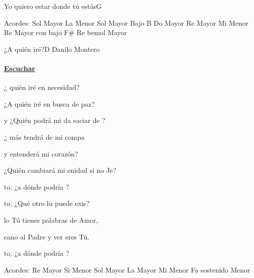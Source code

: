 \documentclass[12pt, spanish]{book}
\begin{document}
\begin{song}{Yo quiero estar donde tú estás}{G}
        \ifChordBk
        \begin{SBOpGroup}
            Acordes:\break
            \upchord{\G}\qquad Sol Mayor \hfill
            \upchord{\Am}\qquad La Menor \hfill\null\break
            \upchord{\GB}\qquad Sol Mayor Bajo B \hfill
            \upchord{\C}\qquad Do Mayor \hfill\null\break
            \upchord{\D}\qquad Re Mayor \hfill
            \upchord{\Em}\qquad Mi Menor \hfill\null\break
            \upchord{\DFs}\qquad Re Mayor con bajo F\# \hfill
            \upchord{\Eflat}Re bemol Mayor \hfill\null\break
        \end{SBOpGroup}
        \fi
    \end{song}

    \begin{song}{¿A quién iré?}{D}
        {} %
        {Danilo Montero}
        {} %
        {}
        \ifChordBk
        \paragraph{\mbox{}\hfill\protect\href{https://open.spotify.com/intl-es/track/6bjDSczvenKmtEqLJAiftS}{Escuchar}\mbox{}\hfill}
        \fi

        \begin{SBOpGroup}
            ¿ quién iré en necesidad? 

                ¿A quién iré en busca de paz?

                y ¿Quién podrá mi da saciar de ?

                ¿ más tendrá de mi compa

                y entenderá mi corazón?

                ¿Quién cambiará mi enidad si no  Je?
        \end{SBOpGroup}

        \begin{SBChorus}
            to, ¿a dónde  podría ?

            to, ¿Qué otro lu puede exis?

            lo Tú tienes palabras de Amor,

            cano al Padre y ver eres Tú.

            to, ¿a dónde  podría ?
        \end{SBChorus}

        \ifChordBk
        \begin{SBOpGroup}
            Acordes:\break
            \upchord{\D}\qquad Re Mayor \hfill
            \upchord{\Bm}\qquad Si Menor \hfill\null\break
            \upchord{\G}\qquad Sol Mayor \hfill
            \upchord{\A}\qquad La Mayor \hfill\null\break
            \upchord{\Em}\qquad Mi Menor \hfill
            \upchord{\Fsm}\qquad Fa sostenido Menor \hfill\null\break
        \end{SBOpGroup}
        \fi
    \end{song}
\end{document}
